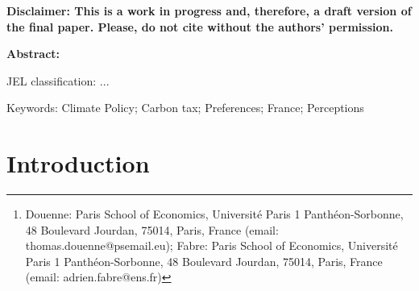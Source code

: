 \documentclass[11pt]{article}
\date{}
\author{Thomas Douenne and Adrien Fabre\footnote{\scriptsize Douenne: Paris School of Economics, Université Paris 1 Panthéon-Sorbonne, 48 Boulevard Jourdan, 75014, Paris, France (email: thomas.douenne@psemail.eu); Fabre: Paris School of Economics, Université Paris 1 Panthéon-Sorbonne, 48 Boulevard Jourdan, 75014, Paris, France (email: adrien.fabre@ens.fr)}}
\date{March 2019}
\begin{document}
\maketitle

\vspace*{1.3cm}

{\Large \textbf{Disclaimer: This is a work in progress and, therefore, a draft version of the final paper.
Please, do not cite without the authors' permission.}}

\vspace*{2em}\begin{center}
\textbf{Abstract:} 
\end{center}

\hfill \break
\hspace*{1cm} \parbox{15cm}{}

\vspace*{2cm}


JEL classification: ...

Keywords: Climate Policy; Carbon tax; Preferences; France; Perceptions 

\newpage
\tableofcontents

\newpage
\section{Introduction}


\end{document}
